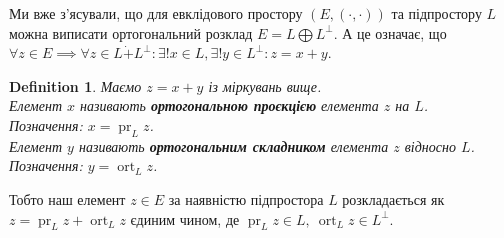 \documentclass[a4paper, 10pt]{article}
\theoremstyle{theoremdd}
\newtheorem{definition}[theorem]{Definition}
\DeclareMathOperator{\ort}{ort}
\DeclareMathOperator{\pr}{pr}
\begin{document}
\noindent
Ми вже з'ясували, що для евклідового простору $(E,(\cdot,\cdot))$ та підпростору $L$ можна виписати ортогональний розклад $E = L \bigoplus L^\perp$. А це означає, що \\
$\forall z \in E \implies \forall z \in L \dot{+} L^\perp: \exists! x \in L, \exists! y \in L^\perp: z = x+y$.

\begin{definition}
Маємо $z = x+y$ із міркувань вище.\\
Елемент $x$ називають \textbf{ортогональною проєкцією} елемента $z$ на $L$.\\
Позначення: $x = \pr_L z$.\\
Елемент $y$ називають \textbf{ортогональним складником} елемента $z$ відносно $L$.\\
Позначення: $y = \ort_L z$.
\end{definition}
\noindent
Тобто наш елемент $z \in E$ за наявністю підпростора $L$ розкладається як $z = \pr_L z + \ort_L z$ єдиним чином, де $\pr_L z \in L,\ \ort_L z \in L^\perp$.
\end{document}
